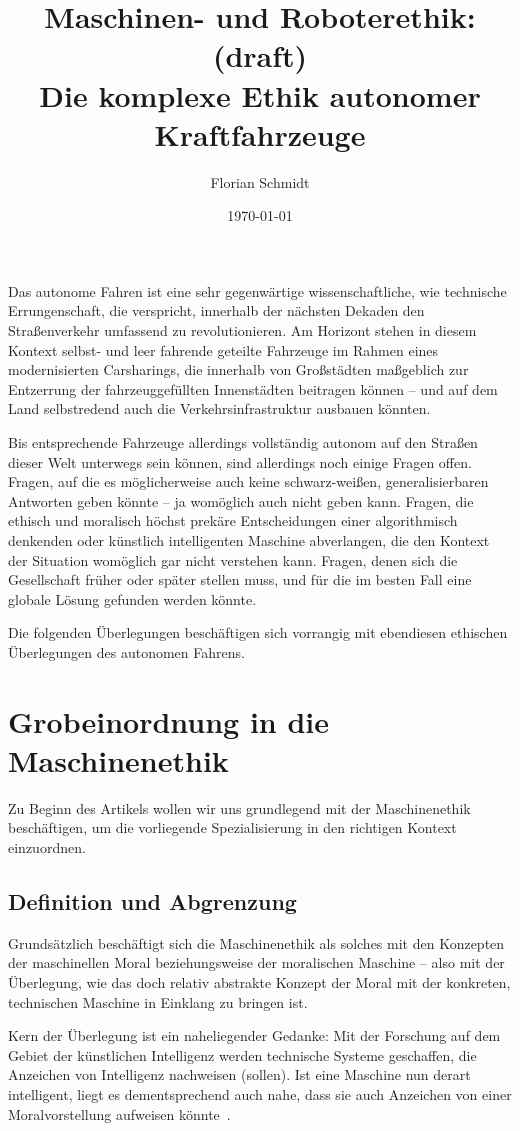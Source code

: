 \documentclass[twocolumn, german]{tum-article}
\title{{\color{TUMBlau} Maschinen- und Roboterethik:} {\color{red} (draft)}\\Die komplexe Ethik autonomer Kraftfahrzeuge}
\author{Florian Schmidt\authormark{1, \,\Letter}}
\affil[1]{Fakultät für Informatik, Technische Universität München (TUM),
  Boltzmannstr. 3, 85748 Garching, Deutschland}
\date{\today}
\begin{document}
\maketitle

Das autonome Fahren ist eine sehr gegenwärtige wissenschaftliche, wie technische Errungenschaft, die verspricht, innerhalb der nächsten Dekaden den Straßenverkehr umfassend zu revolutionieren.
Am Horizont stehen in diesem Kontext selbst- und leer fahrende geteilte Fahrzeuge im Rahmen eines modernisierten Carsharings, die innerhalb von Großstädten maßgeblich zur Entzerrung der fahrzeuggefüllten Innenstädten beitragen können -- und auf dem Land selbstredend auch die Verkehrsinfrastruktur ausbauen könnten.

Bis entsprechende Fahrzeuge allerdings vollständig autonom auf den Straßen dieser Welt unterwegs sein können, sind allerdings noch einige Fragen offen.
Fragen, auf die es möglicherweise auch keine schwarz-weißen, generalisierbaren Antworten geben könnte -- ja womöglich auch nicht geben kann.
Fragen, die ethisch und moralisch höchst prekäre Entscheidungen einer algorithmisch denkenden oder künstlich intelligenten Maschine abverlangen, die den Kontext der Situation womöglich gar nicht verstehen kann.
Fragen, denen sich die Gesellschaft früher oder später stellen muss, und für die im besten Fall eine globale Lösung gefunden werden könnte.

Die folgenden Überlegungen beschäftigen sich vorrangig mit ebendiesen ethischen Überlegungen des autonomen Fahrens.


\section{Grobeinordnung in die Maschinenethik}
Zu Beginn des Artikels wollen wir uns grundlegend mit der Maschinenethik beschäftigen, um die vorliegende Spezialisierung in den richtigen Kontext einzuordnen.


\subsection{Definition und Abgrenzung}
Grundsätzlich beschäftigt sich die Maschinenethik als solches mit den Konzepten der maschinellen Moral beziehungsweise der moralischen Maschine -- also mit der Überlegung, wie das doch relativ abstrakte Konzept der Moral mit der konkreten, technischen Maschine in Einklang zu bringen ist.

Kern der Überlegung ist ein naheliegender Gedanke: Mit der Forschung auf dem Gebiet der künstlichen Intelligenz werden technische Systeme geschaffen, die Anzeichen von Intelligenz nachweisen (sollen).
Ist eine Maschine nun derart intelligent, liegt es dementsprechend auch nahe, dass sie auch Anzeichen von einer Moralvorstellung aufweisen könnte~\cite[S. 3f.]{bendel-mascheth}.
\end{document}

